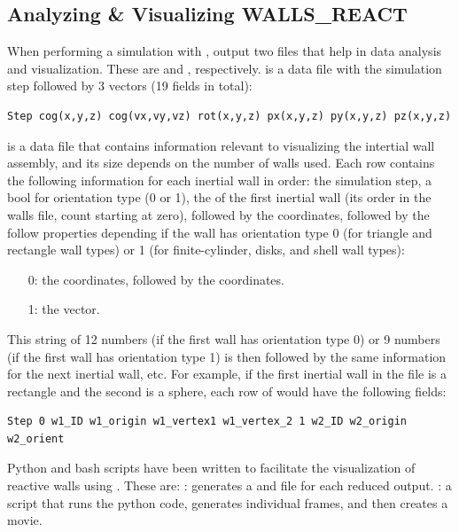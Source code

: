 \subsection{Analyzing \& Visualizing WALLS\_REACT}

When performing a simulation with ,
 output two files that help in data analysis and
visualization.  These are  and
, respectively.   is
a data file with the simulation step followed by 3 vectors (19 fields
in total):

\begin{verbatim}
Step cog(x,y,z) cog(vx,vy,vz) rot(x,y,z) px(x,y,z) py(x,y,z) pz(x,y,z)
\end{verbatim} 

 is a data file that contains information
relevant to visualizing the intertial wall assembly, and its size
depends on the number of walls used.  Each row contains the following
information for each inertial wall in order: the simulation step, a
bool for orientation type (0 or 1), the  of the first
inertial wall (\ie its order in the walls file, count starting at
zero), followed by the  coordinates, followed by the
follow properties depending if the wall has orientation type 0 (for
triangle and rectangle wall types) or 1 (for finite-cylinder, disks,
and shell wall types):
\begin{enumerate}
\item[0:] the  coordinates, followed by the
   coordinates.
\item[1:] the  vector.
\end{enumerate} 
This string of 12 numbers (if the first wall has orientation type 0)
or 9 numbers (if the first wall has orientation type 1) is then
followed by the same information for the next inertial wall, etc.  For
example, if the first inertial wall in the  file is a
rectangle and the second is a sphere, each row of
 would have the following fields:
\begin{verbatim}
Step 0 w1_ID w1_origin w1_vertex1 w1_vertex_2 1 w2_ID w2_origin w2_orient
\end{verbatim}

Python and bash scripts have been written to facilitate the
visualization of reactive walls using .  These
are: : generates a  and
 file for each reduced output.
: a script that runs the python code,
generates individual frames, and then creates a movie.\\

